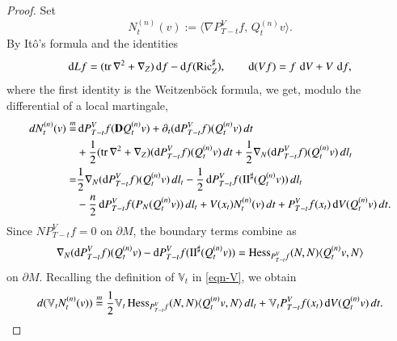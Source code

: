 \documentclass[11pt,twoside, reqno]{article}
\newcommand{\ed}{\mathop{}\!\mathrm{d}}
\def\mathpal#1{\mathop{\mathchoice{\text{\rm #1}}%
   {\text{\rm #1}}{\text{\rm #1}}%
   {\text{\rm #1}}}\nolimits}
\newcommand\Hess{\mathpal{Hess}}
\newcommand\Ric{\mathpal{Ric}}
\newcommand\1{\mathbbm{1}}
\newcommand\II{\mathrm{II}}
\theoremstyle{definition}
\numberwithin{equation}{section}
\begin{document}
\begin{proof}
Set
\[
        N_t^{(n)}(v):=\langle \nabla P_{T-t}^Vf, \, Q_t^{(n)}v\rangle.
\]
By It\^o's formula and the identities
\[
        \ed Lf=(\operatorname{tr}\nabla^2+\nabla_Z)\ed f-\ed f(\Ric_Z^\sharp),
        \qquad
        \ed(Vf)=f\,\ed V+V\,\ed f,
\]
where the first identity is the Weitzenb\"ock formula, we get, modulo the
differential of a local martingale,
\begin{align*}
        dN_t^{(n)}(v)
        \stackrel{m}{=}&
        \ed P_{T-t}^Vf({\bf D}Q_t^{(n)}v)
        +\partial_t(\ed P_{T-t}^Vf)(Q_t^{(n)}v)\,dt
        \\
        &+\frac12(\operatorname{tr}\nabla^2+\nabla_Z)(\ed P_{T-t}^Vf)(Q_t^{(n)}v)\,dt
        +\frac12\nabla_N(\ed P_{T-t}^Vf)(Q_t^{(n)}v)\,dl_t
        \\
        =&\frac12\nabla_N(\ed P_{T-t}^Vf)(Q_t^{(n)}v)\,dl_t
        -\frac12\ed P_{T-t}^Vf(\II^\sharp(Q_t^{(n)}v))\,dl_t
        \\
        &-\frac n2\ed P_{T-t}^Vf(P_N(Q_t^{(n)}v))\,dl_t
        +V(x_t)N_t^{(n)}(v)\,dt
        +P_{T-t}^Vf(x_t)\ed V(Q_t^{(n)}v)\,dt.
\end{align*}
Since $NP_{T-t}^Vf=0$ on $\partial M$, the boundary terms combine as
\[
        \nabla_N(\ed P_{T-t}^Vf)(Q_t^{(n)}v)
        -\ed P_{T-t}^Vf(\II^\sharp(Q_t^{(n)}v))
        =
        \Hess_{P_{T-t}^Vf}(N,N)\langle Q_t^{(n)}v,N\rangle
\]
on $\partial M$. Recalling the definition of $\mathbb V_t$ in \eqref{eqn-V},
we obtain
\begin{equation}\label{Ito-formula1}
        d(\mathbb V_tN_t^{(n)}(v))
        \stackrel{m}{=}
        \frac12\mathbb V_t\Hess_{P_{T-t}^Vf}(N,N)
        \langle Q_t^{(n)}v,N\rangle\,dl_t
        +\mathbb V_tP_{T-t}^Vf(x_t)\ed V(Q_t^{(n)}v)\,dt.
\end{equation}


\end{proof}
\end{document}
